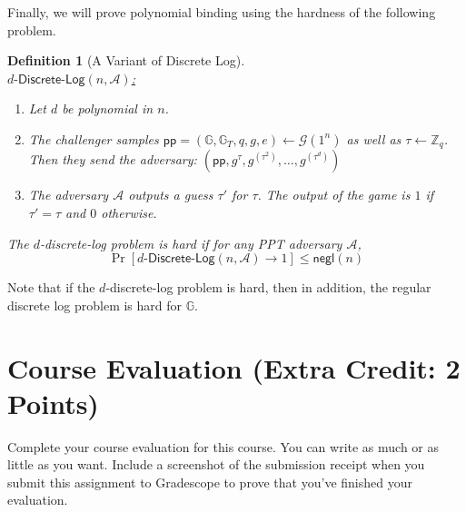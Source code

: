 \documentclass[11pt]{article}
\newcommand{\A}{\mathcal{A}}
\newcommand{\G}{\mathcal{G}}
\newcommand{\GG}{\mathbb{G}}
\newcommand{\pp}{\mathsf{pp}}
\newcommand{\ZZ}{\mathbb{Z}}
\newcommand{\negl}{\mathsf{negl}}
\newtheorem{definition}[theorem]{Definition}
\numberwithin{equation}{section}
\begin{document}
Finally, we will prove polynomial binding using the hardness of the following problem.
\begin{definition}[A Variant of Discrete Log]\label{def:d-discrete-log}
$ $\\
\noindent\underline{$d\text{-}\mathsf{Discrete}\text{-}\mathsf{Log}(n, \A)$:}
\begin{enumerate}
    \item Let $d$ be polynomial in $n$. 
    \item The challenger samples $\pp = (\GG, \GG_T, q, g, e) \leftarrow \G(1^n)$ as well as $\tau \leftarrow \ZZ_q$. Then they send the adversary:
    $\left(\pp, g^{\tau}, g^{(\tau^2)}, \dots, g^{(\tau^{d})}\right)$
    \item The adversary $\A$ outputs a guess $\tau'$ for $\tau$. The output of the game is $1$ if $\tau' = \tau$ and $0$ otherwise.
\end{enumerate}
The $d$-discrete-log problem is hard if for any PPT adversary $\A$, 
\[\Pr[d\text{-}\mathsf{Discrete}\text{-}\mathsf{Log}(n, \A) \to 1] \leq \negl(n)\]
\end{definition}
Note that if the $d$-discrete-log problem is hard, then in addition, the regular discrete log problem is hard for $\GG$.
\pagebreak


\section{Course Evaluation (Extra Credit: 2 Points)}
Complete your course evaluation for this course. You can write as much or as little as you want. Include a screenshot of the submission receipt when you submit this assignment to Gradescope to prove that you've finished your evaluation.\pagebreak
\end{document}
